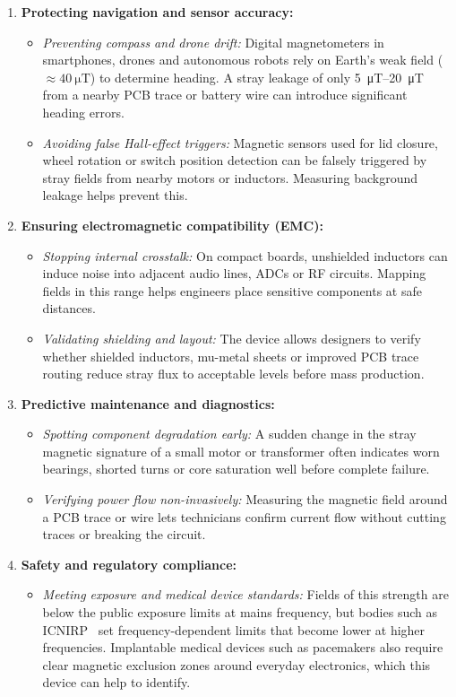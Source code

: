 \documentclass[11pt,a4paper]{article}
\begin{document}
\begin{enumerate}
  \item \textbf{Protecting navigation and sensor accuracy:}
  \begin{itemize}
    \item \textit{Preventing compass and drone drift:} Digital magnetometers in smartphones, drones and autonomous robots rely on Earth's weak field ($\approx\SI{40}{\micro\tesla}$) to determine heading. A stray leakage of only \SIrange{5}{20}{\micro\tesla} from a nearby PCB trace or battery wire can introduce significant heading errors.
    \item \textit{Avoiding false Hall-effect triggers:} Magnetic sensors used for lid closure, wheel rotation or switch position detection can be falsely triggered by stray fields from nearby motors or inductors. Measuring background leakage helps prevent this.
  \end{itemize}

  \item \textbf{Ensuring electromagnetic compatibility (EMC):}
  \begin{itemize}
    \item \textit{Stopping internal crosstalk:} On compact boards, unshielded inductors can induce noise into adjacent audio lines, ADCs or RF circuits. Mapping fields in this range helps engineers place sensitive components at safe distances.
    \item \textit{Validating shielding and layout:} The device allows designers to verify whether shielded inductors, mu-metal sheets or improved PCB trace routing reduce stray flux to acceptable levels before mass production.
  \end{itemize}

  \item \textbf{Predictive maintenance and diagnostics:}
  \begin{itemize}
    \item \textit{Spotting component degradation early:} A sudden change in the stray magnetic signature of a small motor or transformer often indicates worn bearings, shorted turns or core saturation well before complete failure.
    \item \textit{Verifying power flow non-invasively:} Measuring the magnetic field around a PCB trace or wire lets technicians confirm current flow without cutting traces or breaking the circuit.
  \end{itemize}

  \item \textbf{Safety and regulatory compliance:}
  \begin{itemize}
    \item \textit{Meeting exposure and medical device standards:} Fields of this strength are below the public exposure limits at mains frequency, but bodies such as ICNIRP~\cite{icnirp2010} set frequency-dependent limits that become lower at higher frequencies. Implantable medical devices such as pacemakers also require clear magnetic exclusion zones around everyday electronics, which this device can help to identify.
  \end{itemize}
\end{enumerate}
\end{document}
